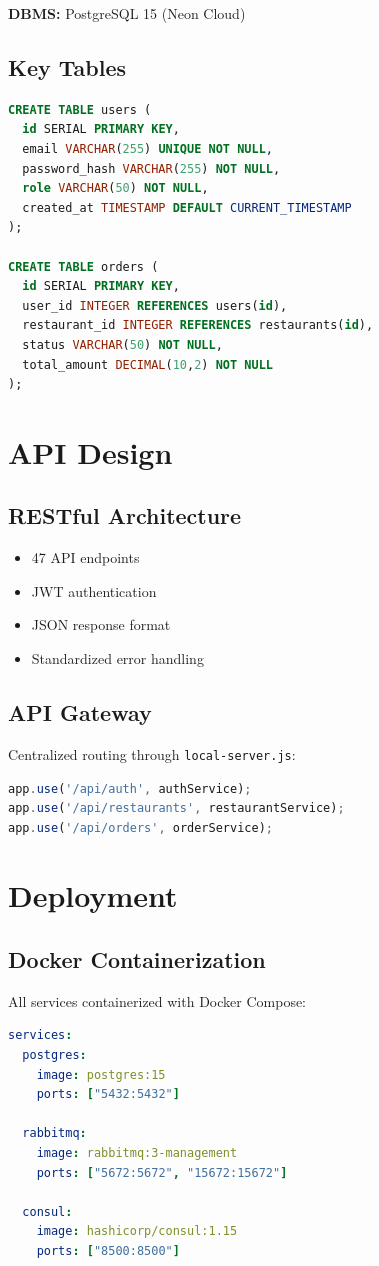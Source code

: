 \documentclass[12pt,a4paper]{article}
\begin{document}
\textbf{DBMS:} PostgreSQL 15 (Neon Cloud)

\subsection{Key Tables}
\begin{lstlisting}[language=SQL]
CREATE TABLE users (
  id SERIAL PRIMARY KEY,
  email VARCHAR(255) UNIQUE NOT NULL,
  password_hash VARCHAR(255) NOT NULL,
  role VARCHAR(50) NOT NULL,
  created_at TIMESTAMP DEFAULT CURRENT_TIMESTAMP
);

CREATE TABLE orders (
  id SERIAL PRIMARY KEY,
  user_id INTEGER REFERENCES users(id),
  restaurant_id INTEGER REFERENCES restaurants(id),
  status VARCHAR(50) NOT NULL,
  total_amount DECIMAL(10,2) NOT NULL
);
\end{lstlisting}

\section{API Design}

\subsection{RESTful Architecture}
\begin{itemize}
    \item 47 API endpoints
    \item JWT authentication
    \item JSON response format
    \item Standardized error handling
\end{itemize}

\subsection{API Gateway}
Centralized routing through \texttt{local-server.js}:
\begin{lstlisting}[language=JavaScript]
app.use('/api/auth', authService);
app.use('/api/restaurants', restaurantService);
app.use('/api/orders', orderService);
\end{lstlisting}

\section{Deployment}

\subsection{Docker Containerization}
All services containerized with Docker Compose:
\begin{lstlisting}[language=yaml]
services:
  postgres:
    image: postgres:15
    ports: ["5432:5432"]
  
  rabbitmq:
    image: rabbitmq:3-management
    ports: ["5672:5672", "15672:15672"]
  
  consul:
    image: hashicorp/consul:1.15
    ports: ["8500:8500"]
\end{lstlisting}
\end{document}
